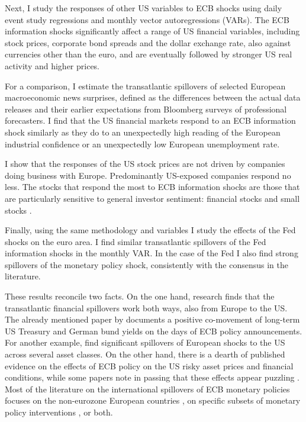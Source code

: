 \documentclass[a4paper,12pt]{article}
\begin{document}
Next, I study the responses of other US variables to ECB shocks
using daily event study regressions and monthly vector autoregressions (VARs).
The ECB information shocks significantly affect a range of US financial variables, 
including stock prices, corporate bond spreads and the dollar exchange rate, also against currencies
other than the euro, and are eventually followed by stronger US real activity and higher prices.

For a comparison, I estimate the transatlantic spillovers of selected European macroeconomic news surprises,
defined as the differences between the actual data releases and their earlier expectations from Bloomberg surveys of professional forecasters.
I find that the US financial markets respond to an ECB information shock similarly as they do
to an unexpectedly high reading of the European industrial confidence or an unexpectedly low European unemployment rate.

I show that the responses of the US stock prices are not driven by companies doing business with Europe.
Predominantly US-exposed companies respond no less. The stocks that respond the most to ECB information shocks are those that are particularly sensitive to general investor sentiment: financial stocks and small stocks \citep{Baker_Wurgler_2006}.

Finally, using the same methodology and variables I study the effects of the Fed shocks on the euro area. I find similar transatlantic spillovers of the Fed information shocks in the monthly VAR.
In the case of the Fed I also find strong spillovers of the monetary policy shock, consistently with the consensus in the literature.

These results reconcile two facts. On the one hand, research finds that the transatlantic financial spillovers work both ways, also from Europe to the US. The already mentioned paper by 
\cite{Curcuru_etal_2018} documents a positive co-movement of long-term US Treasury and German bund yields on the days of ECB policy announcements. 
For another example, \cite{Ehrmann_etal_2011} find significant spillovers of European shocks to the US across several asset classes.
On the other hand, there is a dearth of published evidence on the effects of ECB policy on the US risky asset prices and financial conditions, while
some papers note in passing that these effects appear puzzling \citep[e.g.][]{Rogers_Scotti_Wright_2014,Brusa_etal_2020}.
Most of the literature on the international spillovers of ECB monetary policies focuses on the non-eurozone European countries \citep[e.g.][]{Bluwstein_Canova_2016,Moder_2019,Feldkircher_etal_2020,terEllen_etal_2020,Corsetti_etal_2021},
on specific subsets of monetary policy interventions \citep{Georgiadis_Grab_2016}, or both.
\end{document}
